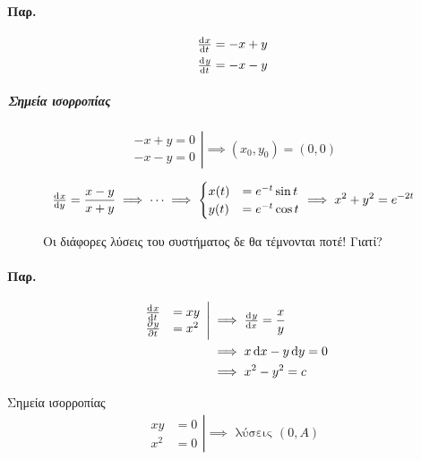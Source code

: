 \documentclass[11pt,a4paper,titlepage,final]{article}
\begin{document}
\paragraph{Παρ.}
\begin{align*}
\od{x}{t} &= -x+y \\
\od{y}{t} &= -x-y
\end{align*}
\subparagraph{Σημεία ισορροπίας}
\[
\left. \begin{array}{l}
-x+y=0 \\
-x-y=0
\end{array} \right| \implies (x_0,y_0) = (0,0)
\]

\begin{align*}
\od{x}{y} = \frac{x-y}{x+y} \implies \cdots \implies \begin{cases}
x(t) &=e^{-t}\sin t \\
y(t) &= e^{-t} \cos t
\end{cases} \implies x^2+y^2=e^{-2t}
\end{align*}

\begin{figure}[h]
Οι διάφορες λύσεις του συστήματος δε θα τέμνονται ποτέ! Γιατί?
\end{figure}


\paragraph{Παρ.}
\begin{align*}
\left. \begin{array}{ll}
\od{x}{t} &= xy \\
\pd{y}{t} &= x^2
\end{array} \right| &\implies \od{y}{x} = \frac{x}{y}
\\ &\implies x\dif x-y\dif y = 0
\\ &\implies x^2-y^2 =c
\end{align*}

Σημεία ισορροπίας
\begin{align*}
\left.
\begin{array}{ll}
xy &=0 \\ x^2 & = 0
\end{array} \right| \implies \text{ λύσεις } (0,A)
\end{align*}
\end{document}
